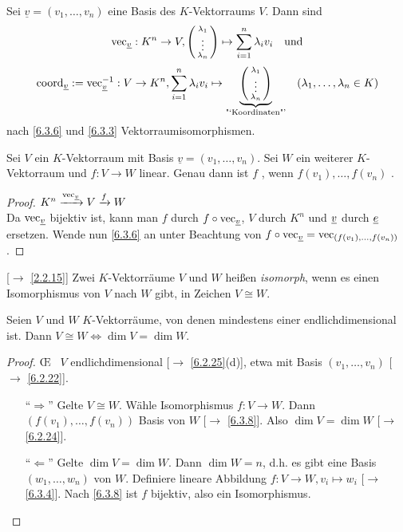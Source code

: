 \documentclass[../../main.tex]{subfiles}
\begin{document}
\begin{notpro}\label{6.3.7}
Sei $\underline{v}=(v_1,\ldots,v_n)$ eine Basis des $K$-Vektorraums $V$. Dann sind
$$\operatorname{vec}_{\underline{v}}:K^n\to V,\left(\begin{smallmatrix}\lambda_1\\\vdots\\\lambda_n\end{smallmatrix}\right)\mapsto \sum_{i=1}^{n}\lambda_iv_i \quad \text{und}$$
$$\operatorname{coord}_{\underline{v}}:=\operatorname{vec}_{\underline{v}}^{-1}:V\to K^n,\sum_{i=1}^{n}\lambda_iv_i\mapsto\underbrace{\left(\begin{smallmatrix}\lambda_1\\\vdots\\\lambda_n\end{smallmatrix}\right)}_\text{"`Koordinaten"'}\quad(\lambda_1,\ldots,\lambda_n\in K)$$
nach \ref{6.3.6} und \ref{6.3.3} Vektorraumisomorphismen.
\end{notpro}

\begin{sat}\label{6.3.8}
Sei $V$ ein $K$-Vektorraum mit Basis $\underline{v}= (v_1,\ldots,v_n)$. Sei $W$ ein weiterer $K$-Vektorraum und $f:V\to W$ linear. Genau dann ist $f$ , wenn $f(v_1),\ldots,f(v_n)$ .
\end{sat}
\begin{proof}
$K^n\xrightarrow{\operatorname{vec}_{\underline{v}}}V\xrightarrow{f}W$\\
Da $\operatorname{vec}_{\underline{v}}$ bijektiv ist, kann man $f$ durch $f\circ \operatorname{vec}_{\underline{v}}$, $V$ durch $K^n$ und ${\underline v}$ durch ${\underline e}$ ersetzen. Wende nun \ref{6.3.6} an unter Beachtung von $f\circ \operatorname{vec}_{\underline v} = \operatorname{vec}_{(f(v_1),\ldots,f(v_n))}$.
\end{proof}

\begin{df}\mbox{}\label{6.3.9}
[$\to$ \ref{2.2.15}] Zwei $K$-Vektorräume $V$ und $W$ heißen \emph{isomorph}, wenn es einen Isomorphismus von $V$ nach $W$ gibt, in Zeichen $V\cong W$.
\end{df}

\begin{sat}\label{6.3.10}
Seien $V$ und $W$ $K$-Vektorräume, von denen mindestens einer endlichdimensional ist. Dann $V\cong W\iff \dim V = \dim W$.
\end{sat}
\begin{proof}
\OE ~ $V$ endlichdimensional [$\to$ \ref{6.2.25}(d)], etwa mit Basis $(v_1,\ldots,v_n)$ [$\to$ \ref{6.2.22}].
\begin{itemize}
\item["`$\Longrightarrow$"'] Gelte $V\cong W$. Wähle Isomorphismus $f:V\to W$. Dann $(f(v_1),\ldots,f(v_n))$ Basis von $W$ [$\to$ \ref{6.3.8}]. Also $\dim V=\dim W$ [$\to$ \ref{6.2.24}].
\item["`$\Longleftarrow$"'] Gelte $\dim V= \dim W$. Dann $\dim W=n$, d.h. es gibt eine Basis $(w_1,\ldots,w_n)$ von $W$. Definiere lineare Abbildung $f:V\to W, v_i\mapsto w_i$ [$\to$ \ref{6.3.4}]. Nach \ref{6.3.8} ist $f$ bijektiv, also ein Isomorphismus.
\end{itemize}
\end{proof}
\end{document}
